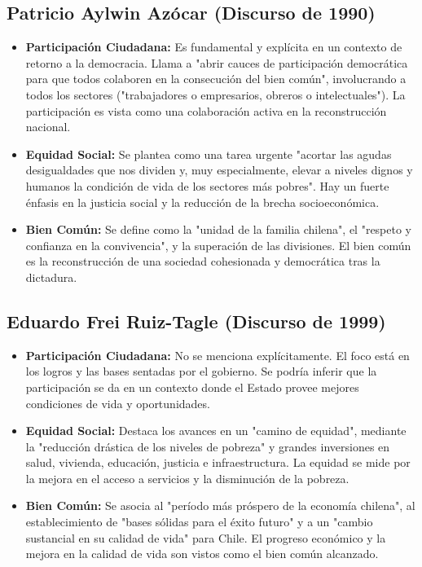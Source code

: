 \documentclass[11pt]{article}
\begin{document}
\subsection*{Patricio Aylwin Azócar (Discurso de 1990)}
\begin{itemize}
    \item \textbf{Participación Ciudadana:} Es fundamental y explícita en un contexto de retorno a la democracia. Llama a "abrir cauces de participación democrática para que todos colaboren en la consecución del bien común", involucrando a todos los sectores ("trabajadores o empresarios, obreros o intelectuales"). La participación es vista como una colaboración activa en la reconstrucción nacional.
    \item \textbf{Equidad Social:} Se plantea como una tarea urgente "acortar las agudas desigualdades que nos dividen y, muy especialmente, elevar a niveles dignos y humanos la condición de vida de los sectores más pobres". Hay un fuerte énfasis en la justicia social y la reducción de la brecha socioeconómica.
    \item \textbf{Bien Común:} Se define como la "unidad de la familia chilena", el "respeto y confianza en la convivencia", y la superación de las divisiones. El bien común es la reconstrucción de una sociedad cohesionada y democrática tras la dictadura.
\end{itemize}

\subsection*{Eduardo Frei Ruiz-Tagle (Discurso de 1999)}
\begin{itemize}
    \item \textbf{Participación Ciudadana:} No se menciona explícitamente. El foco está en los logros y las bases sentadas por el gobierno. Se podría inferir que la participación se da en un contexto donde el Estado provee mejores condiciones de vida y oportunidades.
    \item \textbf{Equidad Social:} Destaca los avances en un "camino de equidad", mediante la "reducción drástica de los niveles de pobreza" y grandes inversiones en salud, vivienda, educación, justicia e infraestructura. La equidad se mide por la mejora en el acceso a servicios y la disminución de la pobreza.
    \item \textbf{Bien Común:} Se asocia al "período más próspero de la economía chilena", al establecimiento de "bases sólidas para el éxito futuro" y a un "cambio sustancial en su calidad de vida" para Chile. El progreso económico y la mejora en la calidad de vida son vistos como el bien común alcanzado.
\end{itemize}
\end{document}
